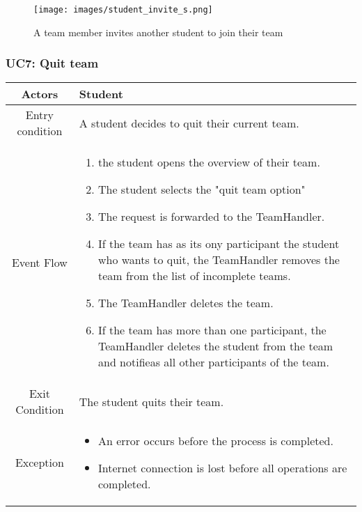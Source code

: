 \documentclass[a4paper, 11pt, titlepage]{article}
\begin{document}
\begin{figure}[h!]
    \centering
    \texttt{[image: images/student\_invite\_s.png]}
    \caption{A team member invites another student to join their team}
    \label{fig:seq_diag_invite_student}
    
\end{figure}

\clearpage

\subsubsection*{UC7: Quit team}
\begin{center}
    \begin{tabularx}{\linewidth} {|c|X|}
        \hline 
        Actors & Student\\
        \hline 
        Entry condition & 
        A student decides to quit their current team.\\
        \hline 
        Event Flow &
        \begin{enumerate}
            \item the student opens the overview of their team.
            \item The student selects the "quit team option"
            \item The request is forwarded to the TeamHandler.
            \item If the team has as its ony participant the student who wants to quit, the TeamHandler removes the 
            team from the list of incomplete teams.
            \item The TeamHandler deletes the team.
            \item If the team has more than one participant, the TeamHandler deletes the student from the team and notifieas all other participants of the team.
        \end{enumerate}\\
        \hline 
        Exit Condition & The student quits their team. \\
        \hline 
        Exception & 
        \begin{itemize}
            \item An error occurs before the process is completed.
            \item Internet connection is lost before all operations are completed.
        \end{itemize}\\
        \hline
    \end{tabularx}
\end{center}
\end{document}
